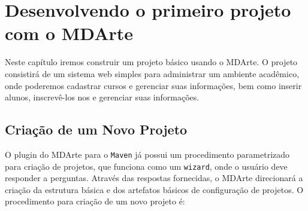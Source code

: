 \chapter{Desenvolvendo o primeiro projeto com o MDArte}

Neste capítulo iremos construir um projeto básico usando o MDArte. O projeto
consistirá de um sistema web simples para administrar um ambiente acadêmico,
onde poderemos cadastrar cursos e gerenciar suas informações, bem como inserir
alunos, inscrevê-los nos e gerenciar suas informações.

\section{Criação de um Novo Projeto}

O plugin do MDArte para o \texttt{Maven} já possui um procedimento parametrizado
para criação de projetos, que funciona como um \texttt{wizard}, onde o usuário
deve responder a perguntas. Através das respostas fornecidas, o MDArte
direcionará a criação da estrutura básica e dos artefatos básicos de
configuração de projetos. O procedimento para criação de um novo projeto é:

